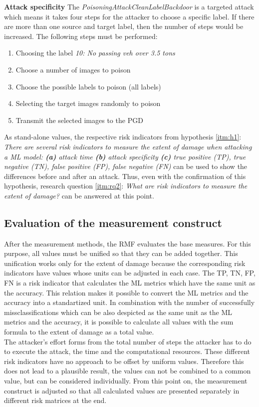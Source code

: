 \noindent\textbf{Attack specificity} The \textit{PoisoningAttackCleanLabelBackdoor} is a targeted attack which means it takes four steps for the attacker to choose a specific label. If there are more than one source and target label, then the number of steps would be increased. The following steps must be performed:

\begin{enumerate}
  \item Choosing the label \textit{10: No passing veh over 3.5 tons}
  \item Choose a number of images to poison
  \item Choose the possible labels to poison (all labels)
  \item Selecting the target images randomly to poison
  \item Transmit the selected images to the PGD
\end{enumerate}

As stand-alone values, the respective risk indicators from hypothesis \ref{itm:h1}: \textit{There are several risk indicators to measure the extent of damage when attacking a ML model: \textbf{(a)} attack time \textbf{(b)} attack specificity \textbf{(c)} true positive (TP), true negative (TN), false positive (FP), false negative (FN)} can be used to show the differences before and after an attack. Thus, even with the confirmation of this hypothesis, research question \ref{itm:rq2}: \textit{What are risk indicators to measure the extent of damage?} can be answered at this point.

\subsection{Evaluation of the measurement construct}

After the measurement methods, the RMF evaluates the base measures. For this purpose, all values must be unified so that they can be added together. This unification works only for the extent of damage because the corresponding risk indicators have values whose units can be adjusted in each case. The TP, TN, FP, FN is a risk indicator that calculates the ML metrics which have the same unit as the accuracy. This relation makes it possible to convert the ML metrics and the accuracy into a standartized unit. In combination with the number of successfully missclassifications which can be also despicted as the same unit as the ML metrics and the accuracy, it is possible to calculate all values with the sum formula to the extent of damage as a total value. \\
The attacker's effort forms from the total number of steps the attacker has to do to execute the attack, the time and the computational resources. These different risk indicators have no approach to be offset by uniform values. Therefore this does not lead to a plausible result, the values can not be combined to a common value, but can be considered individually. From this point on, the measurement construct is adjusted so that all calculated values are presented separately in different risk matrices at the end.

